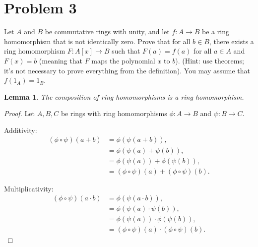 \documentclass[letterpaper, 12pt]{amsart}
\newtheorem{lem}{Lemma}
\begin{document}
	\section*{Problem 3}
	\label{sec:problem_3}
	Let $A$ and $B$ be commutative rings with unity, and let $f : A \to B$ be a ring homomorphism that is not identically zero.
	Prove that for all $b \in B$, there exists a ring homomorphism $F : A[x] \to B$ such that $F(a) = f(a)$ for all $a \in A$ and $F(x) = b$ (meaning that $F$ maps the polynomial $x$ to $b$).
	(Hint: use theorems; it's not necessary to prove everything from the definition).
	You may assume that $f(1_{A}) = 1_{B}$.

		\begin{lem}
		The composition of ring homomorphisms is a ring homomorphism.
		\end{lem}
		\begin{proof}
		Let $A,B,C$ be rings with ring homomorphisms $\phi: A \to B$ and $\psi: B \to C$.

		Additivity:
		\begin{align*}
		(\phi \circ \psi)(a + b) &= \phi(\psi(a+b)), \\
		&= \phi(\psi(a) + \psi(b)), \\
		&= \phi(\psi(a)) + \phi(\psi(b)), \\
		&= (\phi \circ \psi)(a) + (\phi \circ \psi)(b).
		\end{align*}

		Multiplicativity:
		\begin{align*}
		(\phi \circ \psi)(a \cdot b) &= \phi(\psi(a \cdot b)), \\
		&= \phi(\psi(a) \cdot \psi(b)), \\
		&= \phi(\psi(a)) \cdot \phi(\psi(b)), \\
		&= (\phi \circ \psi)(a) \cdot (\phi \circ \psi)(b).
		\end{align*}	
		\end{proof}
\end{document}
